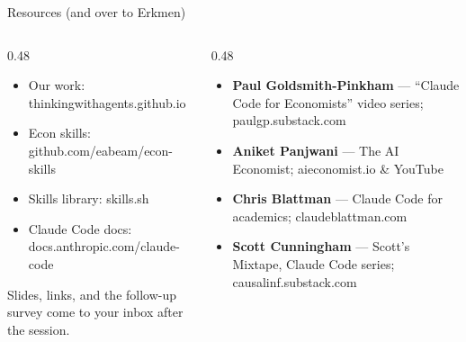 \documentclass[aspectratio=169, 10pt]{beamer}
\begin{document}
\begin{frame}[fragile]{Resources (and over to Erkmen)}
\vskip2pt
\begin{columns}[T]
\begin{column}{0.48\textwidth}
\begin{tcolorbox}[keybox, title={\faLink\quad Tools \& skills}, top=3pt, bottom=3pt]
\small
\begin{itemize}\setlength{\itemsep}{2pt}
  \item Our work: {\scriptsize\ttfamily thinkingwithagents.github.io}
  \item Econ skills: {\scriptsize\ttfamily github.com/eabeam/econ-skills}
  \item Skills library: {\scriptsize\ttfamily skills.sh}
  \item Claude Code docs: {\scriptsize\ttfamily docs.anthropic.com/claude-code}
\end{itemize}
\end{tcolorbox}
\vskip3pt
\begin{tcolorbox}[accentbox, top=2pt, bottom=2pt]
\scriptsize Slides, links, and the follow-up survey come to your inbox after the session.
\end{tcolorbox}
\end{column}
\begin{column}{0.48\textwidth}
\begin{tcolorbox}[keybox, title={\faUsers\quad People worth following}, top=3pt, bottom=3pt]
\scriptsize
\begin{itemize}\setlength{\itemsep}{3pt}
  \item \textbf{Paul Goldsmith-Pinkham} --- ``Claude Code for Economists'' video series; {\ttfamily paulgp.substack.com}
  \item \textbf{Aniket Panjwani} --- The AI Economist; {\ttfamily aieconomist.io} \& YouTube
  \item \textbf{Chris Blattman} --- Claude Code for academics; {\ttfamily claudeblattman.com}
  \item \textbf{Scott Cunningham} --- Scott's Mixtape, Claude Code series; {\ttfamily causalinf.substack.com}
\end{itemize}
\end{tcolorbox}
\end{column}
\end{columns}
\end{frame}
\end{document}
